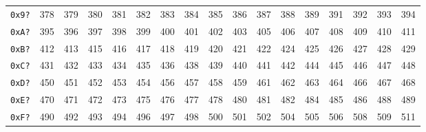 {{\begin{tabular}{|r|r|r|r|r|r|r|r|r|r|r|r|r|r|r|r|r|}
\texttt{0x9?} & 378 & 379 & 380 & 381 & 382 & 383 & 384 & 385 & 386 & 387 & 388 & 389 & 391 & 392 & 393 & 394 \\
\texttt{0xA?} & 395 & 396 & 397 & 398 & 399 & 400 & 401 & 402 & 403 & 405 & 406 & 407 & 408 & 409 & 410 & 411 \\
\texttt{0xB?} & 412 & 413 & 415 & 416 & 417 & 418 & 419 & 420 & 421 & 422 & 424 & 425 & 426 & 427 & 428 & 429 \\
\texttt{0xC?} & 431 & 432 & 433 & 434 & 435 & 436 & 438 & 439 & 440 & 441 & 442 & 444 & 445 & 446 & 447 & 448 \\
\texttt{0xD?} & 450 & 451 & 452 & 453 & 454 & 456 & 457 & 458 & 459 & 461 & 462 & 463 & 464 & 466 & 467 & 468 \\
\texttt{0xE?} & 470 & 471 & 472 & 473 & 475 & 476 & 477 & 478 & 480 & 481 & 482 & 484 & 485 & 486 & 488 & 489 \\
\texttt{0xF?} & 490 & 492 & 493 & 494 & 496 & 497 & 498 & 500 & 501 & 502 & 504 & 505 & 506 & 508 & 509 & 511 \\
\hline
\end{tabular}
}

\clearpage

}
